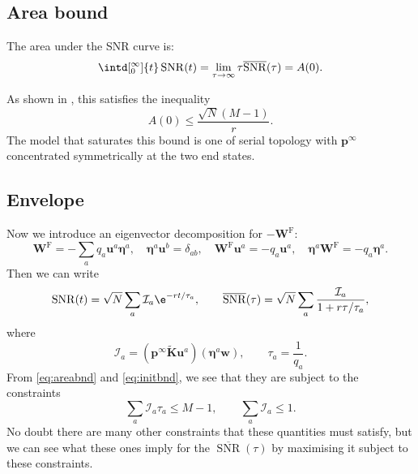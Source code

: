 \documentclass[12pt]{article}
\newcommand{\pr}{\mathbf{p}}
\newcommand{\eq}{\pr^\infty}
\newcommand{\w}{\mathbf{w}}
\newcommand{\W}{\mathbf{W}}
\newcommand{\enc}{\mathbf{K}}
\newcommand{\frg}{\W^{\mathrm{F}}}
\newcommand{\ench}{\widetilde{\enc}}
\newcommand{\evr}{\mathbf{u}}
\newcommand{\evl}{\boldsymbol{\eta}}
\DeclareMathOperator{\snr}{SNR}
\newcommand{\snrb}{\overline{\snr}}
\newcommand{\CI}{\mathcal{I}}
\begin{document}
\subsection{Area bound}\label{sec:area}

The area under the SNR curve is:
%
\begin{equation}\label{eq:areadef}
  \intd[_0^\infty]{t} \snr(t) = \lim_{\tau\to\infty} \tau \snrb(\tau) = A(0).
\end{equation}
%

As shown in \cite{Lahiri2013synapse}, this satisfies the inequality
%
\begin{equation}\label{eq:areabnd}
  A(0) \leq \frac{\sqrt{N}(M-1)}{r}.
\end{equation}
%
The model that saturates this bound is one of serial topology with $\eq$ concentrated symmetrically at the two end states.



\subsection{Envelope}\label{sec:envelope}

Now we introduce an eigenvector decomposition for $-\frg$:
%
\begin{equation}\label{eq:eigendecomp}
  \frg = - \sum_a q_a \evr^a \evl^a,
  \quad
  \evl^a \evr^b = \delta_{ab},
  \quad
  \frg \evr^a = -q_a \evr^a,
  \quad
  \evl^a \frg = -q_a \evl^a.
\end{equation}
%
Then we can write
%
\begin{equation}\label{eqsnreig}
  \snr(t) = \sqrt{N}\sum_a \CI_a \e^{-rt/\tau_a},
  \qquad
  \snrb(\tau) = \sqrt{N}\sum_a \frac{\CI_a}{1+r\tau/\tau_a},
\end{equation}
%
where
%
\begin{equation}\label{eq:snrcoeffs}
  \CI_a = (\eq \ench \evr^a) (\evl^a \w),
  \qquad
  \tau_a = \frac{1}{q_a}.
\end{equation}
%
From \eqref{eq:areabnd} and \eqref{eq:initbnd}, we see that they are subject to the constraints
%
\begin{equation}\label{eq:coeffconstr}
  \sum_a \CI_a \tau_a \leq M-1,
  \qquad
  \sum_a \CI_a \leq 1.
\end{equation}
%
No doubt there are many other constraints that these quantities must satisfy, but we can see what these ones imply for the $\snrb(\tau)$ by maximising it subject to these constraints.
\end{document}
